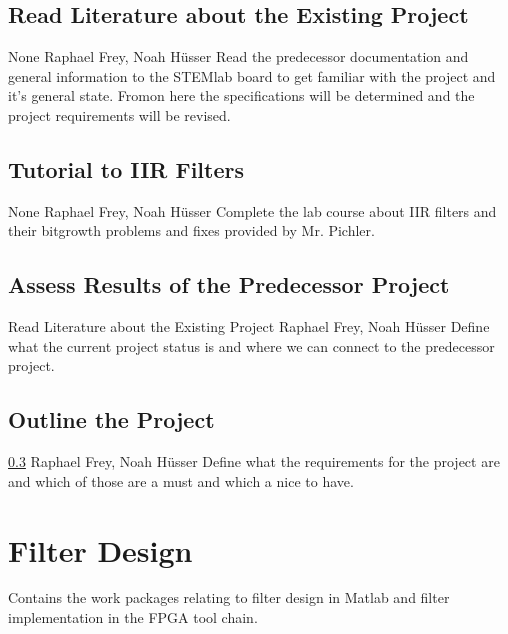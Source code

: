 \documentclass[a4paper,oneside]{alpenspecs/alpenspecs}
\begin{document}
\subsection{Read Literature about the Existing Project}
\label{subsec:general:read}

\wpac
    {}
    {}
    {}
    {None}
    {}
    {Raphael Frey, Noah Hüsser}
    {%
        Read the predecessor documentation and general information to the STEMlab board to get familiar with the project and it's general state.
        Fromon here the specifications will be determined and the project requirements will be revised.
    }

\subsection{Tutorial to IIR Filters}
\label{subsec:general:iir}

\wpac
    {}
    {}
    {}
    {None}
    {}
    {Raphael Frey, Noah Hüsser}
    {%
        Complete the lab course about IIR filters and their bitgrowth problems and fixes provided by Mr. Pichler.
    }

\subsection{Assess Results of the Predecessor Project}
\label{subsec:general:assess}

\wpac
    {}
    {}
    {}
    {Read Literature about the Existing Project}
    {}
    {Raphael Frey, Noah Hüsser}
    {%
        Define what the current project status is and where we can connect to the predecessor project.
    }

\subsection{Outline the Project}
\label{subsec:general:outline}

\wpac
    {}
    {}
    {}
    {\ref{subsec:general:assess}}
    {}
    {Raphael Frey, Noah Hüsser}
    {%
        Define what the requirements for the project are and which of those are a must and which a nice to have.
    }

\section{Filter Design}
\label{sec:filters}

Contains the  work packages  relating to  filter design  in Matlab  and filter
implementation in the FPGA tool chain.
\end{document}
